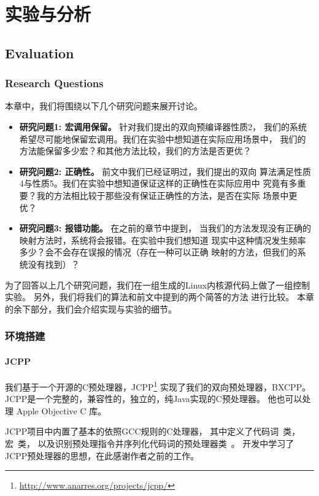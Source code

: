 \chapter{实验与分析}
\section{Evaluation}
\label{sec:evaluation}
\subsection{Research Questions}
本章中，我们将围绕以下几个研究问题来展开讨论。
\begin{itemize}
\item {\bf 研究问题1: 宏调用保留。} 针对我们提出的双向预编译器性质2，
  我们的系统希望尽可能地保留宏调用。我们在实验中想知道在实际应用场景中，
  我们的方法能保留多少宏？和其他方法比较，我们的方法是否更优？
\item {\bf 研究问题2: 正确性。} 前文中我们已经证明过，我们提出的双向
  算法满足性质4与性质5。我们在实验中想知道保证这样的正确性在实际应用中
  究竟有多重要？我的方法相比较于那些没有保证正确性的方法，是否在实际
  场景中更优？
\item {\bf 研究问题3: 报错功能。}  在之前的章节中提到，
  当我们的方法发现没有正确的映射方法时，系统将会报错。在实验中我们想知道
  现实中这种情况发生频率多少？会不会存在误报的情况（存在一种可以正确
  映射的方法，但我们的系统没有找到）？
\end{itemize}

为了回答以上几个研究问题，我们在一组生成的Linux内核源代码上做了一组控制
实验。
另外，我们将我们的算法和前文中提到的两个简答的方法
进行比较。
本章的余下部分，我们会介绍实现与实验的细节。

\subsection{环境搭建}

\subsubsection{JCPP}
我们基于一个开源的C预处理器，JCPP\footnote{\url{http://www.anarres.org/projects/jcpp/}}
实现了我们的双向预处理器，BXCPP。
JCPP是一个完整的，兼容性的，独立的，纯Java实现的C预处理器。
他也可以处理 Apple Objective C 库。

JCPP项目中内置了基本的依照GCC规则的C处理器，
其中定义了代码词~类，宏~类，
以及识别预处理指令并序列化代码词的预处理器类~。
开发中学习了JCPP预处理器的思想，在此感谢作者之前的工作。

